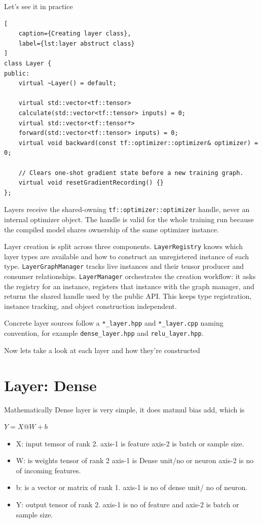 Let's see it in practice

\begin{lstlisting}[
    caption={Creating layer class},
    label={lst:layer abstruct class}
]
class Layer {
public:
    virtual ~Layer() = default;

    virtual std::vector<tf::tensor>
    calculate(std::vector<tf::tensor> inputs) = 0;
    virtual std::vector<tf::tensor*>
    forward(std::vector<tf::tensor> inputs) = 0;
    virtual void backward(const tf::optimizer::optimizer& optimizer) = 0;

    // Clears one-shot gradient state before a new training graph.
    virtual void resetGradientRecording() {}
};
\end{lstlisting}

Layers receive the shared-owning \texttt{tf::optimizer::optimizer} handle, never
an internal optimizer object. The handle is valid for the whole training run
because the compiled model shares ownership of the same optimizer instance.

Layer creation is split across three components. \texttt{LayerRegistry} knows
which layer types are available and how to construct an unregistered instance
of each type. \texttt{LayerGraphManager} tracks live instances and their tensor
producer and consumer relationships. \texttt{LayerManager} orchestrates the
creation workflow: it asks the registry for an instance, registers that
instance with the graph manager, and returns the shared handle used by the
public API. This keeps type registration, instance tracking, and object
construction independent.

Concrete layer sources follow a \texttt{*\_layer.hpp} and
\texttt{*\_layer.cpp} naming convention, for example
\texttt{dense\_layer.hpp} and \texttt{relu\_layer.hpp}.

Now lets take a look at each layer and how they're constructed

\section{Layer: Dense}

Mathematically Dense layer is very simple, it does matmul bias
add, which is

$
Y = X@W + b
$

\begin{itemize}
    \item X: input temsor of rank 2. axis-1 is feature
    axis-2 is batch or sample size.
    \item W: is weights tensor of rank 2 axis-1 is Dense
    unit/no or neuron axis-2 is no of incoming features.
    \item b: is a vector or matrix of rank 1. axis-1 is
    no of dense unit/ no of neuron.
    \item Y: output tensor of rank 2. axis-1 is no of
    feature and axis-2 is batch or sample size.
\end{itemize}

